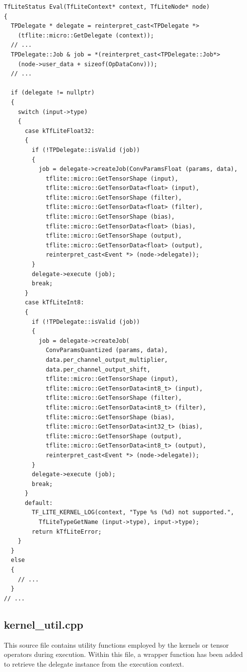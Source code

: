 \begin{lstlisting}
TfLiteStatus Eval(TfLiteContext* context, TfLiteNode* node)
{
  TPDelegate * delegate = reinterpret_cast<TPDelegate *>
    (tflite::micro::GetDelegate (context));
  // ...
  TPDelegate::Job & job = *(reinterpret_cast<TPDelegate::Job*>
    (node->user_data + sizeof(OpDataConv)));
  // ...

  if (delegate != nullptr)
  {
    switch (input->type)
    {
      case kTfLiteFloat32:
      {
        if (!TPDelegate::isValid (job))
        {
          job = delegate->createJob(ConvParamsFloat (params, data),
            tflite::micro::GetTensorShape (input),
            tflite::micro::GetTensorData<float> (input),
            tflite::micro::GetTensorShape (filter),
            tflite::micro::GetTensorData<float> (filter),
            tflite::micro::GetTensorShape (bias),
            tflite::micro::GetTensorData<float> (bias),
            tflite::micro::GetTensorShape (output),
            tflite::micro::GetTensorData<float> (output),
            reinterpret_cast<Event *> (node->delegate));
        }
        delegate->execute (job);
        break;
      }
      case kTfLiteInt8:
      {
        if (!TPDelegate::isValid (job))
        {
          job = delegate->createJob(
            ConvParamsQuantized (params, data),
            data.per_channel_output_multiplier,
            data.per_channel_output_shift,
            tflite::micro::GetTensorShape (input),
            tflite::micro::GetTensorData<int8_t> (input),
            tflite::micro::GetTensorShape (filter),
            tflite::micro::GetTensorData<int8_t> (filter),
            tflite::micro::GetTensorShape (bias),
            tflite::micro::GetTensorData<int32_t> (bias),
            tflite::micro::GetTensorShape (output),
            tflite::micro::GetTensorData<int8_t> (output),
            reinterpret_cast<Event *> (node->delegate));
        }
        delegate->execute (job);
        break;
      }
      default:
        TF_LITE_KERNEL_LOG(context, "Type %s (%d) not supported.",
          TfLiteTypeGetName (input->type), input->type);
        return kTfLiteError;
    }
  }
  else
  {
    // ...
  }
// ...
\end{lstlisting}

\subsection*{kernel\_util.cpp}
This source file contains utility functions employed by the kernels or tensor operators during execution. Within this file, a wrapper function has been added to retrieve the delegate instance from the execution context.

